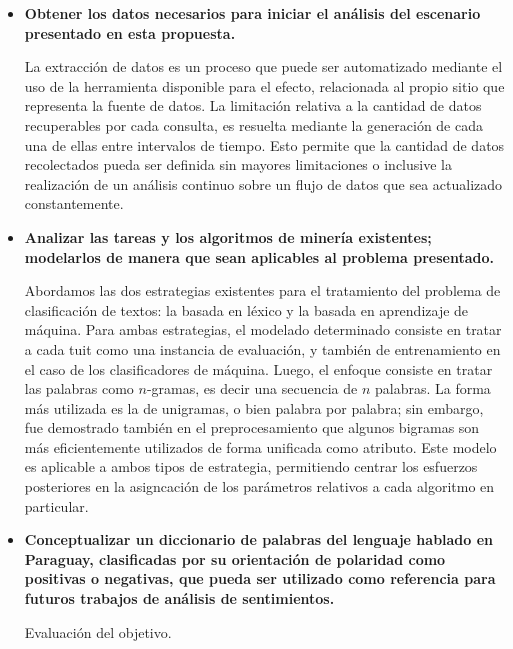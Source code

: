 \begin{itemize}
\item \textbf{Obtener los datos necesarios para iniciar el an\'alisis del escenario presentado en esta propuesta.}
\newline

La extracci\'on de datos es un proceso que puede ser automatizado mediante el uso de la herramienta disponible para el efecto, relacionada al propio sitio que representa la fuente de datos. La limitaci\'on relativa a la cantidad de datos recuperables por cada consulta, es resuelta mediante la generaci\'on de cada una de ellas entre intervalos de tiempo. Esto permite que la cantidad de datos recolectados pueda ser definida sin mayores limitaciones o inclusive la realizaci\'on de un an\'alisis continuo sobre un flujo de datos que sea actualizado constantemente.
\newline

\item \textbf{Analizar las tareas y los algoritmos de miner\'ia existentes; modelarlos de manera que sean aplicables al problema presentado.}
\newline

Abordamos las dos estrategias existentes para el tratamiento del problema de clasificaci\'on de textos: la basada en l\'exico y la basada en aprendizaje de m\'aquina. Para ambas estrategias, el modelado determinado consiste en tratar a cada tuit como una instancia de evaluaci\'on, y tambi\'en de entrenamiento en el caso de los clasificadores de m\'aquina. Luego, el enfoque consiste en tratar las palabras como $n$-gramas, es decir una secuencia de $n$ palabras. La forma m\'as utilizada es la de unigramas, o bien palabra por palabra; sin embargo, fue demostrado tambi\'en en el preprocesamiento que algunos bigramas son m\'as eficientemente utilizados de forma unificada como atributo. Este modelo es aplicable a ambos tipos de estrategia, permitiendo centrar los esfuerzos posteriores en la asigncaci\'on de los par\'ametros relativos a cada algoritmo en particular.
\newline

\item \textbf{Conceptualizar un diccionario de palabras del lenguaje hablado en Paraguay, clasificadas por su orientaci\'on de polaridad como positivas o negativas, que pueda ser utilizado como referencia para futuros trabajos de an\'alisis de sentimientos.}
\newline

Evaluaci\'on del objetivo.
\newline


\end{itemize}

